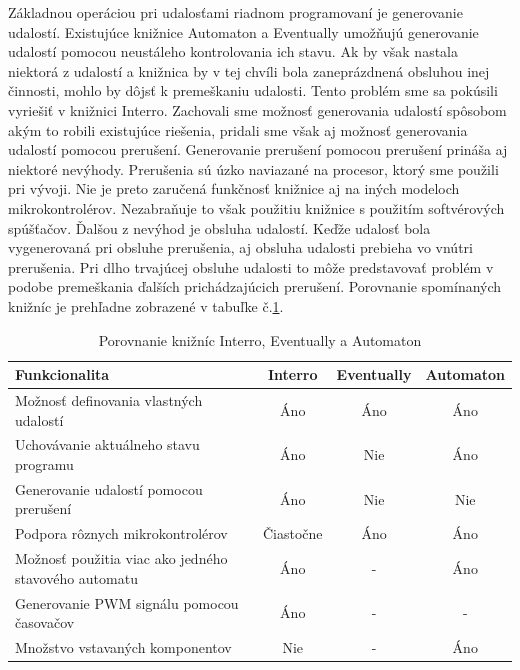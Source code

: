 Základnou operáciou pri udalosťami riadnom programovaní je generovanie udalostí. Existujúce knižnice Automaton a Eventually umožňujú generovanie udalostí pomocou
neustáleho kontrolovania ich stavu. Ak by však nastala niektorá z udalostí a knižnica by v tej chvíli bola zaneprázdnená obsluhou inej činnosti,
mohlo by dôjsť k premeškaniu udalosti. Tento problém sme sa pokúsili vyriešiť v knižnici Interro. Zachovali sme
možnosť generovania udalostí spôsobom akým to robili existujúce riešenia, pridali sme však aj možnosť generovania udalostí pomocou prerušení. Generovanie prerušení pomocou prerušení
prináša aj niektoré nevýhody. Prerušenia sú úzko naviazané na procesor, ktorý sme použili pri vývoji. Nie je preto zaručená funkčnosť knižnice aj na iných modeloch
mikrokontrolérov. Nezabraňuje to však použitiu knižnice s použitím
softvérových spúšťačov. Ďalšou z nevýhod je obsluha udalostí. Keďže udalosť bola vygenerovaná pri obsluhe prerušenia, aj obsluha udalosti prebieha vo vnútri prerušenia.
Pri dlho trvajúcej obsluhe udalosti to môže predstavovať problém v podobe premeškania ďalších prichádzajúcich prerušení.
Porovnanie spomínaných knižníc je prehľadne zobrazené v tabuľke č.\ref{table:library-compare}.
\begin{table}[!htbp]
    \begin{center}
        \begin{tabular}{| m{20em} | c | c | c |}
            \hline
            Funkcionalita                                        & Interro   & Eventually & Automaton \\
            \hline
            Možnosť definovania vlastných udalostí               & Áno       & Áno        & Áno       \\
            \hline
            Uchovávanie aktuálneho stavu programu                & Áno       & Nie        & Áno       \\
            \hline
            Generovanie udalostí pomocou prerušení               & Áno       & Nie        & Nie       \\
            \hline
            Podpora rôznych mikrokontrolérov                     & Čiastočne & Áno        & Áno       \\
            \hline
            Možnosť použitia viac ako jedného stavového automatu & Áno       & -          & Áno       \\
            \hline
            Generovanie PWM signálu pomocou časovačov            & Áno       & -          & -         \\
            \hline
            Množstvo vstavaných komponentov                      & Nie       & -          & Áno       \\
            \hline
        \end{tabular}
        \caption{Porovnanie knižníc Interro, Eventually a Automaton}
        \label{table:library-compare}
    \end{center}
\end{table}

